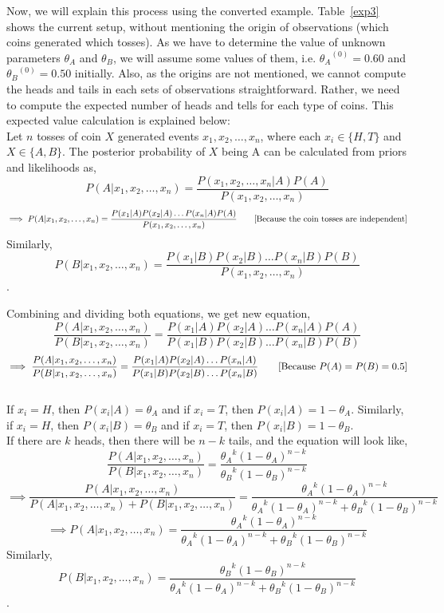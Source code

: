 Now, we will explain this process using the converted example. Table~\ref{exp3} shows the current setup, without mentioning the origin of observations (which coins generated which tosses). As we have to determine the value of unknown parameters $\theta_A$ and $\theta_B$, we will assume some values of them, i.e. ${\theta_A}^{(0)}=0.60$ and ${\theta_B}^{(0)}=0.50$ initially. Also, as the origins are not mentioned, we cannot compute the heads and tails in each sets of observations straightforward. Rather, we need to compute the expected number of heads and tells for each type of coins. This expected value calculation is explained below:\\

Let $n$ tosses of coin $X$ generated events $x_1,x_2, \ldots, x_n$, where each $x_i \in \{H,T\}$ and $X \in \{A,B\}$. The posterior probability of $X$ being A can be calculated from priors and likelihoods as, 
\[ P(A \rvert x_1,x_2, \ldots, x_n )= \frac{P( x_1,x_2, \ldots, x_n  \rvert A)P(A)}{P(x_1,x_2, \ldots, x_n )}\] \[\implies P(A \rvert x_1,x_2, \ldots, x_n )= \frac{P( x_1\rvert A)P(x_2 \rvert A)\ldots P(x_n \rvert A)P(A)}{P(x_1,x_2, \ldots, x_n )} \\\tag*{[Because the coin tosses are independent]}\]
Similarly, \[P(B \rvert x_1,x_2, \ldots, x_n )= \frac{P( x_1\rvert B)P(x_2 \rvert B)\ldots P(x_n \rvert B)P(B)}{P(x_1,x_2, \ldots, x_n )}\].

Combining and dividing both equations, we get new equation,
\[ \frac{ P(A \rvert x_1,x_2, \ldots, x_n )}{ P(B \rvert x_1,x_2, \ldots, x_n )} = \frac{P( x_1\rvert A)P(x_2 \rvert A)\ldots P(x_n \rvert A)P(A)}{P( x_1\rvert B)P(x_2 \rvert B)\ldots P(x_n \rvert B)P(B)}\]\[ \implies 
\frac{ P(A \rvert x_1,x_2, \ldots, x_n )}{ P(B \rvert x_1,x_2, \ldots, x_n )} = \frac{P( x_1\rvert A)P(x_2 \rvert A)\ldots P(x_n \rvert A)}{P( x_1\rvert B)P(x_2 \rvert B)\ldots P(x_n \rvert B)} \\\tag*{[Because $P(A)=P(B)=0.5$]}
\]\\
If $x_i= H$, then $P(x_i \rvert A)= \theta_{A}$ and if $x_i= T$, then $P(x_i \rvert A)=1- \theta_{A}$. Similarly, if $x_i= H$, then $P(x_i \rvert B)= \theta_{B}$ and if $x_i= T$, then $P(x_i \rvert B)=1- \theta_{B}$.\\
If there are $k$ heads, then there will be $n-k$ tails, and the equation will look like,
\[ \frac{ P(A \rvert x_1,x_2, \ldots, x_n )}{ P(B \rvert x_1,x_2, \ldots, x_n )} = \frac{ {\theta_{A}}^{k}{(1-\theta_{A})}^{n-k} }{ {\theta_{B}}^{k}{(1-\theta_{B})}^{n-k}}\]
\[\implies 
\frac{ P(A \rvert x_1,x_2, \ldots, x_n )}{P(A \rvert x_1,x_2, \ldots, x_n )+ P(B \rvert x_1,x_2, \ldots, x_n )} = \frac{{\theta_{A}}^{k}{(1-\theta_{A})}^{n-k}}{{\theta_{A}}^{k}{(1-\theta_{A})}^{n-k}+ {\theta_{B}}^{k}{(1-\theta_{B})}^{n-k}}
\]
\[\implies 
P(A \rvert x_1,x_2, \ldots, x_n ) = \frac{{\theta_{A}}^{k}{(1-\theta_{A})}^{n-k}}{{\theta_{A}}^{k}{(1-\theta_{A})}^{n-k}+ {\theta_{B}}^{k}{(1-\theta_{B})}^{n-k}}
\]Similarly, \[P(B \rvert x_1,x_2, \ldots, x_n ) = \frac{{\theta_{B}}^{k}{(1-\theta_{B})}^{n-k}}{{\theta_{A}}^{k}{(1-\theta_{A})}^{n-k}+ {\theta_{B}}^{k}{(1-\theta_{B})}^{n-k}}
\].

